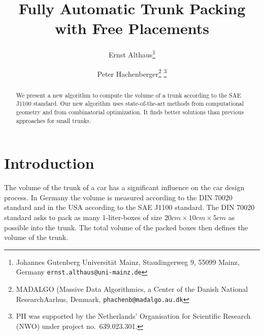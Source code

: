 \documentclass{article}
\newcounter{algo}
\begin{document}
\title{Fully Automatic Trunk Packing with Free Placements}
\author{Ernst Althaus\thanks{Johannes Gutenberg Universit\"at Mainz, Staudingerweg 9, 55099 Mainz, Germany
{\tt ernst.althaus@uni-mainz.de}} \and Peter
Hachenberger\thanks{MADALGO (Massive Data Algorithmics, a Center of the Danish National ResearchAarhus, Denmark, {\tt phachenb@madalgo.au.dk}}
\thanks{PH was supported by the
Netherlands' Organisation for Scientific Research (NWO) under project
no.~639.023.301.}}




\maketitle

\begin{abstract}
We present a new algorithm to compute the volume of a trunk according
to the SAE J1100 standard. Our new algorithm uses state-of-the-art
methods from computational geometry and from combinatorial
optimization. It finds better solutions than previous approaches for
small trunks.
\end{abstract}

\section{Introduction}
\label{sec:introduction}

The volume of the trunk of a car has a significant influence on the
car design process. In Germany the volume is measured according to the
DIN 70020 standard and in the USA according to the SAE J1100 standard.
The DIN 70020 standard asks to pack as many 1-liter-boxes of size
$20cm\times 10cm\times 5cm$ as possible into the trunk. The total
volume of the packed boxes then defines the volume of the trunk.
\end{document}
